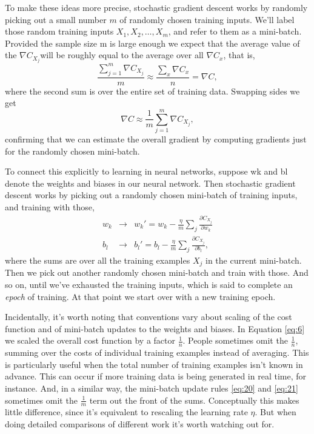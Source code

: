 \documentclass[a4paper,twoside,10pt]{book}
\begin{document}
To make these ideas more precise, stochastic gradient descent works by randomly picking out a small number $m$ of randomly chosen training inputs. We'll label those random training inputs $X_1,X_2,\ldots,X_m$, and refer to them as a mini-batch. Provided the sample size m is large enough we expect that the average value of the $\nabla C_{X_j}$will be roughly equal to the average over all $\nabla C_x$, that is,
\begin{equation}
	\frac{\sum_{j=1}^m \nabla C_{X_{j}}}{m} \approx \frac{\sum_x \nabla C_x}{n} = \nabla C,
	\label{eq:18}
\end{equation}
where the second sum is over the entire set of training data. Swapping sides we get
\begin{equation}
\nabla C \approx \frac{1}{m} \sum_{j=1}^m \nabla C_{X_{j}},
	\label{eq:19}
\end{equation}
confirming that we can estimate the overall gradient by computing gradients just for the randomly chosen mini-batch.

To connect this explicitly to learning in neural networks, suppose wk and bl denote the weights and biases in our neural network. Then stochastic gradient descent works by picking out a randomly chosen mini-batch of training inputs, and training with those,
\begin{eqnarray} 
w_k & \rightarrow & w_k' = w_k-\frac{\eta}{m} \sum_j \frac{\partial C_{X_j}}{\partial w_k}\label{eq:20}\\
b_l & \rightarrow & b_l' = b_l-\frac{\eta}{m} \sum_j \frac{\partial C_{X_j}}{\partial b_l}\label{eq:21},
\end{eqnarray}
where the sums are over all the training examples $X_j$ in the current mini-batch. Then we pick out another randomly chosen mini-batch and train with those. And so on, until we've exhausted the training inputs, which is said to complete an \textit{epoch} of training. At that point we start over with a new training epoch.

Incidentally, it's worth noting that conventions vary about scaling of the cost function and of mini-batch updates to the weights and biases. In Equation \ref{eq:6} we scaled the overall cost function by a factor $\frac1n$. People sometimes omit the $\frac1n$, summing over the costs of individual training examples instead of averaging. This is particularly useful when the total number of training examples isn't known in advance. This can occur if more training data is being generated in real time, for instance. And, in a similar way, the mini-batch update rules \ref{eq:20} and \ref{eq:21} sometimes omit the $\frac1m$ term out the front of the sums. Conceptually this makes little difference, since it's equivalent to rescaling the learning rate $\eta$. But when doing detailed comparisons of different work it's worth watching out for.
\end{document}
